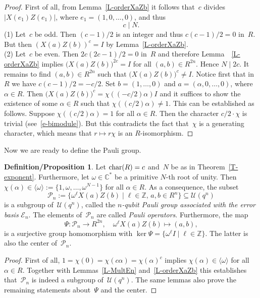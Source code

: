 \documentclass[11pt]{article}
\theoremstyle{definition}
\newtheorem{defiprop}[theo]{Definition/Proposition}
\numberwithin{equation}{section}
\newcommand{\Z}{{\mathbb Z}}
\newcommand{\C}{{\mathbb C}}
\newcommand{\cE}{{\mathcal E}}
\newcommand{\cP}{{\mathcal P}}
\newcommand{\cU}{{\mathcal U}}
\newcommand{\Char}{\mbox{${\rm char}$}}
\newcommand{\group}[1]{\mbox{$\langle{#1}\rangle$}}
\newcounter{alp}
\newcounter{ara}
\newcounter{rom}
\begin{document}
\begin{proof}
First of all, from Lemma~\ref{L-orderXaZb} it follows that~$c$ divides $|X(e_1)Z(e_1)|$, where $e_1=(1,0,\ldots,0)$, and thus
\[
    c\mid N.
\]
(1) Let~$c$ be odd. Then $(c-1)/2$ is an integer and thus $c(c-1)/2=0$ in~$R$.
But then $(X(a)Z(b))^c=I$ by Lemma~\ref{L-orderXaZb}.
\\
(2) Let~$c$ be even.
Then $2c(2c-1)/2=0$ in~$R$ and therefore Lemma~~\ref{L-orderXaZb} implies $\big(X(a)Z(b)\big)^{2c}=I$ for all $(a,b)\in R^{2n}$.
Hence $N\mid 2c$.
It remains to find $(a,b)\in R^{2n}$ such that $\big(X(a)Z(b)\big)^c\neq I$.
Notice first that in~$R$ we have $c(c-1)/2=-c/2$.
Set $b=(1,\ldots,0)$ and $a=(\alpha,0,\ldots,0)$, where $\alpha\in R$.
Then $\big(X(a)Z(b)\big)^c=\chi((-c/2)\alpha)I$ and it suffices to show the existence of some $\alpha\in R$ such that $\chi((c/2)\alpha)\neq1$.
This can be established as follows.
Suppose $\chi((c/2)\alpha)=1$ for all $\alpha\in R$.
Then  the character $c/2\cdot\chi$ is trivial (see~\eqref{e-bimodule}).
But this contradicts the fact that~$\chi$ is a generating character, which means that $r\longmapsto r\chi$ is an $R$-isomorphism.
\end{proof}


Now we are ready to define the Pauli group.

\begin{defiprop}\label{D-Pauli}
Let $\Char(R)=c$ and~$N$ be as in Theorem~\ref{T-exponent}. Furthermore, let $\omega\in\C^*$ be a primitive $N$-th root of unity.
Then $\chi(\alpha)\in\group{\omega}:=\{1,\omega,\ldots,\omega^{N-1}\}$ for all $\alpha\in R$.
As a consequence, the subset
\[
   \cP_n:=\{\omega^\ell X(a)Z(b)\mid \ell\in\Z,\,a,b\in R^{n}\}\subseteq\cU(q^n)
\]
 is a subgroup of~$\cU(q^n)$, called the \emph{$n$-qubit Pauli group associated with the error basis} $\cE_n$.
The elements of~$\cP_n$ are called \emph{Pauli operators}.
Furthermore, the map
\[
  \Psi:\cP_n\longrightarrow R^{2n},\quad \omega^\ell X(a)Z(b)\longmapsto (a,b),
\]
is a surjective group homomorphism with $\ker\Psi=\{\omega^\ell I\mid \ell\in\Z\}$.
The latter is also the center of~$\cP_n$.
\end{defiprop}

\begin{proof}
First of all, $1=\chi(0)=\chi(c\alpha)=\chi(\alpha)^c$ implies $\chi(\alpha)\in\group{\omega}$ for all $\alpha\in R$.
Together with Lemmas~\ref{L-MultEn} and~\ref{L-orderXaZb} this establishes that~$\cP_n$ is indeed a subgroup of~$\cU(q^n)$.
The same lemmas also prove the remaining statements about~$\Psi$ and the center.
\end{proof}
\end{document}

